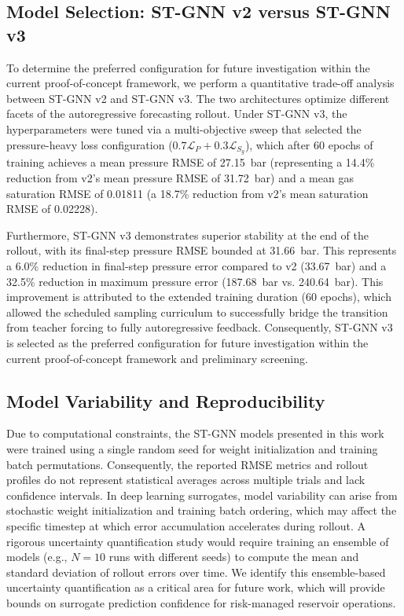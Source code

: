 \documentclass[10pt,twocolumn]{article}
\begin{document}
\subsection{Model Selection: ST-GNN v2 versus ST-GNN v3}
To determine the preferred configuration for future investigation within the current proof-of-concept framework, we perform a quantitative trade-off analysis between ST-GNN v2 and ST-GNN v3. The two architectures optimize different facets of the autoregressive forecasting rollout. Under ST-GNN v3, the hyperparameters were tuned via a multi-objective sweep that selected the pressure-heavy loss configuration ($0.7\mathcal{L}_P + 0.3\mathcal{L}_{S_g}$), which after 60 epochs of training achieves a mean pressure RMSE of 27.15~bar (representing a 14.4\% reduction from v2's mean pressure RMSE of 31.72~bar) and a mean gas saturation RMSE of 0.01811 (a 18.7\% reduction from v2's mean saturation RMSE of 0.02228). 

Furthermore, ST-GNN v3 demonstrates superior stability at the end of the rollout, with its final-step pressure RMSE bounded at 31.66~bar. This represents a 6.0\% reduction in final-step pressure error compared to v2 (33.67~bar) and a 32.5\% reduction in maximum pressure error (187.68~bar vs. 240.64~bar). This improvement is attributed to the extended training duration (60 epochs), which allowed the scheduled sampling curriculum to successfully bridge the transition from teacher forcing to fully autoregressive feedback. Consequently, ST-GNN v3 is selected as the preferred configuration for future investigation within the current proof-of-concept framework and preliminary screening.

\subsection{Model Variability and Reproducibility}
\label{subsec:uq}
Due to computational constraints, the ST-GNN models presented in this work were trained using a single random seed for weight initialization and training batch permutations. Consequently, the reported RMSE metrics and rollout profiles do not represent statistical averages across multiple trials and lack confidence intervals. In deep learning surrogates, model variability can arise from stochastic weight initialization and training batch ordering, which may affect the specific timestep at which error accumulation accelerates during rollout. A rigorous uncertainty quantification study would require training an ensemble of models (e.g., $N=10$ runs with different seeds) to compute the mean and standard deviation of rollout errors over time. We identify this ensemble-based uncertainty quantification as a critical area for future work, which will provide bounds on surrogate prediction confidence for risk-managed reservoir operations.
\end{document}
